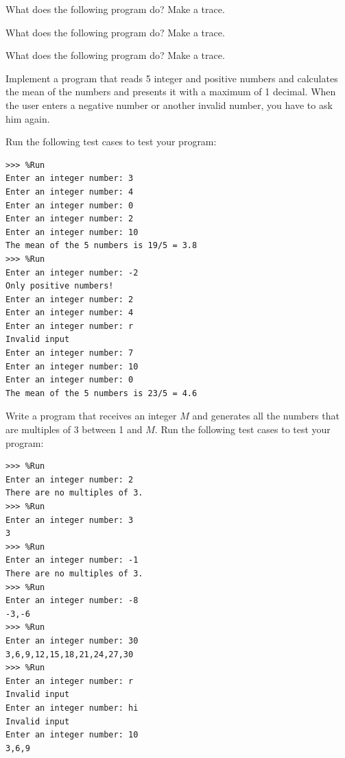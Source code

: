 \begin{exercise}
What does the following program do? Make a trace.

\end{exercise}

\begin{exercise}
What does the following program do? Make a trace.

\end{exercise}

\begin{exercise}
What does the following program do? Make a trace.

\end{exercise}



\begin{exercise}
Implement a program that reads 5 integer and positive numbers and calculates the mean of the numbers and presents it with a maximum of 1 decimal. When the user enters a negative number or another invalid number, you have to ask him again.
 
  Run the following test cases to test your program:

\begin{Verbatim}[frame=single, label={\em test execution of the program}]
>>> %Run 
Enter an integer number: 3
Enter an integer number: 4
Enter an integer number: 0
Enter an integer number: 2
Enter an integer number: 10
The mean of the 5 numbers is 19/5 = 3.8
>>> %Run 
Enter an integer number: -2
Only positive numbers!
Enter an integer number: 2
Enter an integer number: 4
Enter an integer number: r
Invalid input
Enter an integer number: 7
Enter an integer number: 10
Enter an integer number: 0
The mean of the 5 numbers is 23/5 = 4.6
\end{Verbatim}


\end{exercise}

\begin{exercise} 
Write a program that receives an integer $M$ and generates all the numbers that are multiples of 3 between 1 and $M$. Run the following test cases to test your program:

\begin{Verbatim}[frame=single, label={\em test execution of the program}]
>>> %Run 
Enter an integer number: 2
There are no multiples of 3.
>>> %Run 
Enter an integer number: 3
3
>>> %Run 
Enter an integer number: -1
There are no multiples of 3.
>>> %Run 
Enter an integer number: -8
-3,-6
>>> %Run 
Enter an integer number: 30
3,6,9,12,15,18,21,24,27,30
>>> %Run 
Enter an integer number: r
Invalid input
Enter an integer number: hi
Invalid input
Enter an integer number: 10
3,6,9
\end{Verbatim}
\end{exercise}

